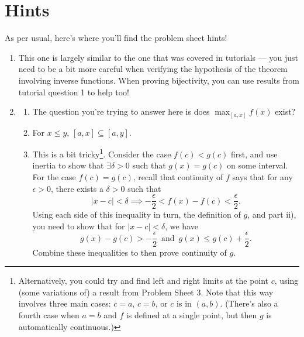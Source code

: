 \documentclass[
  17pt,
  a4paper]{extarticle}
\providecommand{\tightlist}{%
  \setlength{\itemsep}{0pt}\setlength{\parskip}{0pt}}
\theoremstyle{plain}
\theoremstyle{definition}
\theoremstyle{plain}
\theoremstyle{plain}
\theoremstyle{plain}
\theoremstyle{plain}
\theoremstyle{definition}
\theoremstyle{definition}
\theoremstyle{remark}
\theoremstyle{remark}
\renewcommand{\;}{\,}
\begin{document}
\hypertarget{hints}{%
\section{Hints}\label{hints}}

As per usual, here's where you'll find the problem sheet hints!

\begin{enumerate}
\def\labelenumi{\arabic{enumi})}
\item
  This one is largely similar to the one that was covered in tutorials --- you just need to be a bit more careful when verifying the hypothesis of the theorem involving inverse functions. When proving bijectivity, you can use results from tutorial question 1 to help too!
\item
  \begin{enumerate}
  \def\labelenumii{\roman{enumii})}
  \tightlist
  \item
    The question you're trying to answer here is does \(\max_{[a,x]}f(x)\) exist?
  \item
    For \(x \leq y\), \([a,x] \subseteq [a,y]\).
  \item
    This is a bit tricky\footnote{Alternatively, you could try and find left and right limits at the point \(c\), using (some variations of) a result from Problem Sheet 3. Note that this way involves three main cases: \(c = a\), \(c = b\), or \(c\) is in \((a,b)\). (There's also a fourth case when \(a = b\) and \(f\) is defined at a single point, but then \(g\) is automatically continuous.)}. Consider the case \(f(c) < g(c)\) first, and use inertia to show that \(\exists \delta > 0\) such that \(g(x) = g(c)\) on some interval. For the case \(f(c) = g(c)\), recall that continuity of \(f\) says that for any \(\epsilon > 0\), there exists a \(\delta > 0\) such that \[\lvert x - c \rvert < \delta \implies -\frac{\epsilon}{2} < f(x) - f(c) < \frac{\epsilon}{2}.\] Using each side of this inequality in turn, the definition of \(g\), and part ii), you need to show that for \(\lvert x - c \rvert < \delta\), we have \[g(x) - g(c) > -\frac{\epsilon}{2}\;\;\;\text{and}\;\;\;g(x) \leq g(c) + \frac{\epsilon}{2}.\] Combine these inequalities to then prove continuity of \(g\).
  \end{enumerate}
\end{enumerate}
\end{document}
